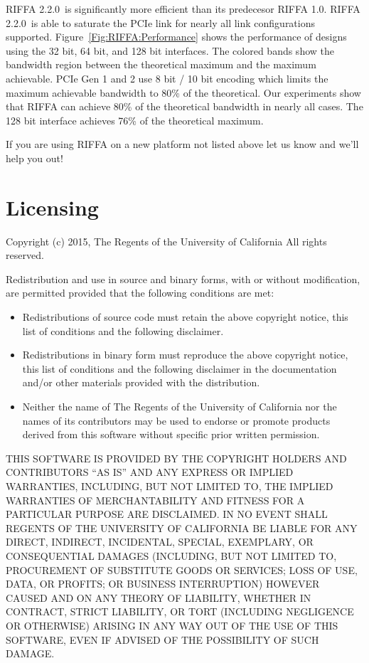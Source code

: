 \documentclass{refrep}
\newcommand{\RIFFAVer}{2.2.0}
\begin{document}
RIFFA \RIFFAVer~is significantly more efficient than its predecesor RIFFA
1.0. RIFFA \RIFFAVer~is able to saturate the PCIe link for nearly all link
configurations supported. Figure~\ref{Fig:RIFFA:Performance} shows the
performance of designs using the 32 bit, 64 bit, and 128 bit interfaces. The
colored bands show the bandwidth region between the theoretical maximum and the
maximum achievable. PCIe Gen 1 and 2 use 8 bit / 10 bit encoding which limits
the maximum achievable bandwidth to 80\% of the theoretical. Our experiments
show that RIFFA can achieve 80\% of the theoretical bandwidth in nearly all
cases. The 128 bit interface achieves 76\% of the theoretical maximum.

If you are using RIFFA on a new platform not listed above let us know and we’ll
help you out!

\section{Licensing}

Copyright (c) 2015, The Regents of the University of California All rights
reserved.

Redistribution and use in source and binary forms, with or without modification,
are permitted provided that the following conditions are met:

\begin{itemize}
    \item Redistributions of source code must retain the above copyright
      notice, this list of conditions and the following disclaimer.

    \item Redistributions in binary form must reproduce the above
      copyright notice, this list of conditions and the following
      disclaimer in the documentation and/or other materials provided
      with the distribution.

    \item Neither the name of The Regents of the University of California
      nor the names of its contributors may be used to endorse or
      promote products derived from this software without specific
      prior written permission.
\end{itemize}

THIS SOFTWARE IS PROVIDED BY THE COPYRIGHT HOLDERS AND CONTRIBUTORS ``AS IS''
AND ANY EXPRESS OR IMPLIED WARRANTIES, INCLUDING, BUT NOT LIMITED TO, THE
IMPLIED WARRANTIES OF MERCHANTABILITY AND FITNESS FOR A PARTICULAR PURPOSE ARE
DISCLAIMED. IN NO EVENT SHALL REGENTS OF THE UNIVERSITY OF CALIFORNIA BE LIABLE
FOR ANY DIRECT, INDIRECT, INCIDENTAL, SPECIAL, EXEMPLARY, OR CONSEQUENTIAL
DAMAGES (INCLUDING, BUT NOT LIMITED TO, PROCUREMENT OF SUBSTITUTE GOODS OR
SERVICES; LOSS OF USE, DATA, OR PROFITS; OR BUSINESS INTERRUPTION) HOWEVER
CAUSED AND ON ANY THEORY OF LIABILITY, WHETHER IN CONTRACT, STRICT LIABILITY, OR
TORT (INCLUDING NEGLIGENCE OR OTHERWISE) ARISING IN ANY WAY OUT OF THE USE OF
THIS SOFTWARE, EVEN IF ADVISED OF THE POSSIBILITY OF SUCH DAMAGE.
\end{document}
